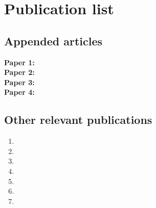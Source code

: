 
\nobibliography*

\clearpage

\chapter*{Publication list}

\section*{Appended articles}
\begin{description}
\item[\textbf{Paper 1:}] 
\item[\textbf{Paper 2:}] 
\item[\textbf{Paper 3:}] 
\item[\textbf{Paper 4:}] 
\end{description}

\section*{Other relevant publications}

\begin{enumerate}
\item {}
\item {}
\item {}
\item {}
\item {}
\item {}
\item {}
\end{enumerate}
